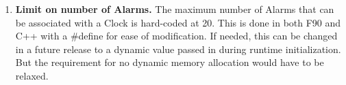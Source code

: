 
\begin{enumerate}

\item {\bf Limit on number of Alarms.}  The maximum number of Alarms that 
can be associated with a Clock is hard-coded
at 20.  This is done in both F90 and  C++ with a \#define for ease of
modification.  If needed, this can be changed in a future release to a 
dynamic value passed in during runtime initialization.  But the requirement 
for no dynamic memory allocation would have to be relaxed.

\end{enumerate}